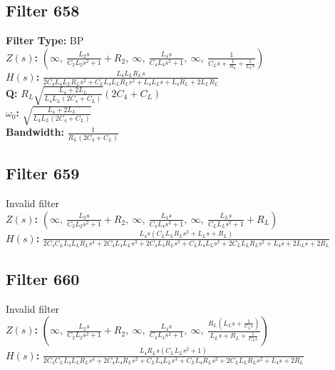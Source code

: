 \documentclass{article}
\begin{document}
\subsection*{Filter 658}
\textbf{Filter Type:} BP \\ 
\textbf{$Z(s)$:} $\left( \infty, \  \frac{L_{2} s}{C_{2} L_{2} s^{2} + 1} + R_{2}, \  \infty, \  \frac{L_{4} s}{C_{4} L_{4} s^{2} + 1}, \  \infty, \  \frac{1}{C_{L} s + \frac{1}{R_{L}} + \frac{1}{L_{L} s}}\right)$ \\ 
\textbf{$H(s)$:} $\frac{L_{4} L_{L} R_{L} s}{2 C_{4} L_{4} L_{L} R_{L} s^{2} + C_{L} L_{4} L_{L} R_{L} s^{2} + L_{4} L_{L} s + L_{4} R_{L} + 2 L_{L} R_{L}}$ \\ 
\textbf{Q:} $R_{L} \sqrt{\frac{L_{4} + 2 L_{L}}{L_{4} L_{L} \left(2 C_{4} + C_{L}\right)}} \left(2 C_{4} + C_{L}\right)$ \\ 
\textbf{$\omega_0$:} $\sqrt{\frac{L_{4} + 2 L_{L}}{L_{4} L_{L} \left(2 C_{4} + C_{L}\right)}}$ \\ 
\textbf{Bandwidth:} $\frac{1}{R_{L} \left(2 C_{4} + C_{L}\right)}$ \\ 
\subsection*{Filter 659}
Invalid filter \\ 
\textbf{$Z(s)$:} $\left( \infty, \  \frac{L_{2} s}{C_{2} L_{2} s^{2} + 1} + R_{2}, \  \infty, \  \frac{L_{4} s}{C_{4} L_{4} s^{2} + 1}, \  \infty, \  \frac{L_{L} s}{C_{L} L_{L} s^{2} + 1} + R_{L}\right)$ \\ 
\textbf{$H(s)$:} $\frac{L_{4} s \left(C_{L} L_{L} R_{L} s^{2} + L_{L} s + R_{L}\right)}{2 C_{4} C_{L} L_{4} L_{L} R_{L} s^{4} + 2 C_{4} L_{4} L_{L} s^{3} + 2 C_{4} L_{4} R_{L} s^{2} + C_{L} L_{4} L_{L} s^{3} + 2 C_{L} L_{L} R_{L} s^{2} + L_{4} s + 2 L_{L} s + 2 R_{L}}$ \\ 
\subsection*{Filter 660}
Invalid filter \\ 
\textbf{$Z(s)$:} $\left( \infty, \  \frac{L_{2} s}{C_{2} L_{2} s^{2} + 1} + R_{2}, \  \infty, \  \frac{L_{4} s}{C_{4} L_{4} s^{2} + 1}, \  \infty, \  \frac{R_{L} \left(L_{L} s + \frac{1}{C_{L} s}\right)}{L_{L} s + R_{L} + \frac{1}{C_{L} s}}\right)$ \\ 
\textbf{$H(s)$:} $\frac{L_{4} R_{L} s \left(C_{L} L_{L} s^{2} + 1\right)}{2 C_{4} C_{L} L_{4} L_{L} R_{L} s^{4} + 2 C_{4} L_{4} R_{L} s^{2} + C_{L} L_{4} L_{L} s^{3} + C_{L} L_{4} R_{L} s^{2} + 2 C_{L} L_{L} R_{L} s^{2} + L_{4} s + 2 R_{L}}$ \\ 
\end{document}
